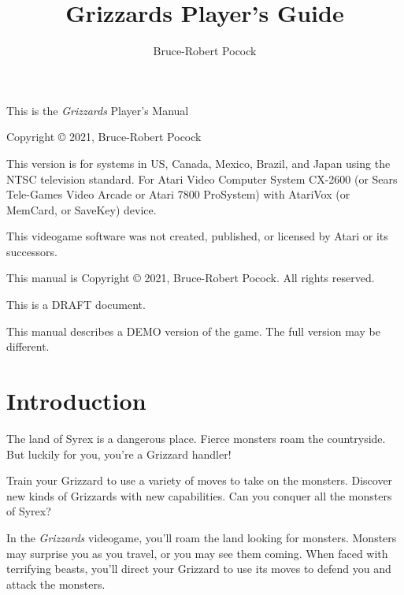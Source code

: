 \documentclass[12pt,twoside,openright,book]{memoir}
\title{Grizzards Player's Guide}
\author{Bruce-Robert Pocock}
\makeatletter
\newcommand\TV{NTSC}
\newcommand\REGION{US, Canada, Mexico, Brazil, and Japan}
\newcommand\TV{PAL}
\newcommand\REGION{UK and Europe (except France)}
\newcommand\TV{SECAM}
\newcommand\REGION{France, Russia, Africa}
\def\maketitle{%
  \null
  \thispagestyle{empty}%
  \vfill
  \begin{center}\leavevmode
    \normalfont
    {\LARGE\raggedleft \@author\par}%
    \hrulefill\par
    {\huge\raggedright \@title\par}%
    \vskip 1cm
  \end{center}%
  \vfill
  \null
  \cleardoublepage
  }
\makeatother
\begin{document}


\maketitle

\frontmatter

\null\vfill

\begin{flushleft}
This is the \textit{Grizzards} Player's Manual

Copyright \copyright{} 2021, Bruce-Robert Pocock

\bigskip

This  version is  for systems  in \REGION{}  using the  \TV{} television
standard. For Atari  Video Computer System CX-2600  (or Sears Tele-Games
Video  Arcade or  Atari 7800  ProSystem) with  AtariVox (or  MemCard, or
SaveKey) device.

\bigskip

This videogame software was not created, published, or licensed by Atari
or its successors.

\bigskip

\thedate

\bigskip

This  manual  is  Copyright   \copyright{}  2021,  Bruce-Robert  Pocock.
All rights reserved.

\bigskip

This is a DRAFT document.

\ifdef\DEMO
This manual describes  a DEMO version of the game.  The full version may
be different.
\fi

\end{flushleft}
\let\cleardoublepage\clearpage

\mainmatter

\chapter{Introduction}\label{Introduction}

The  land of  Syrex  is  a dangerous  place.  Fierce  monsters roam  the
countryside. But luckily for you, you're a Grizzard handler!

Train your Grizzard to  use a variety of moves to  take on the monsters.
Discover new kinds  of Grizzards with new capabilities.  Can you conquer
all the monsters of Syrex?

In the \textit{Grizzards}  videogame, you'll roam the land  looking for monsters.
Monsters may  surprise you as  you travel, or  you may see  them coming.
When faced  with terrifying beasts,  you'll direct your Grizzard  to use
its moves to defend you and attack the monsters.
\end{document}
